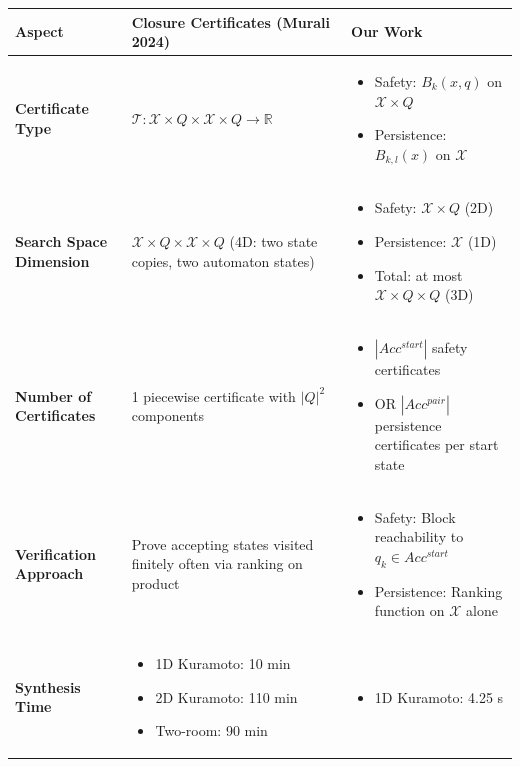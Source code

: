 \documentclass{article}
\begin{document}
\begin{center}
\begin{tabular}{|p{4cm}|p{5cm}|p{5cm}|}
\hline
\textbf{Aspect} & \textbf{Closure Certificates (Murali 2024)} & \textbf{Our Work} \\
\hline
\textbf{Certificate Type} & $\mathcal{T}: \mathcal{X} \times Q \times \mathcal{X} \times Q \rightarrow \mathbb{R}$ &
\begin{itemize}
\item Safety: $B_k(x,q)$ on $\mathcal{X} \times Q$
\item Persistence: $B_{k,l}(x)$ on $\mathcal{X}$
\end{itemize} \\
\hline
\textbf{Search Space Dimension} & $\mathcal{X} \times Q \times \mathcal{X} \times Q$ (4D: two state copies, two automaton states) &
\begin{itemize}
\item Safety: $\mathcal{X} \times Q$ (2D)
\item Persistence: $\mathcal{X}$ (1D)
\item Total: at most $\mathcal{X} \times Q \times Q$ (3D)
\end{itemize} \\
\hline
\textbf{Number of Certificates} & 1 piecewise certificate with $|Q|^2$ components &
\begin{itemize}
\item $|Acc^{start}|$ safety certificates
\item OR $|Acc^{pair}|$ persistence certificates per start state
\end{itemize} \\
\hline
\textbf{Verification Approach} & Prove accepting states visited finitely often via ranking on product &
\begin{itemize}
\item Safety: Block reachability to $q_k \in Acc^{start}$
\item Persistence: Ranking function on $\mathcal{X}$ alone
\end{itemize} \\
\hline
\textbf{Synthesis Time} &
\begin{itemize}
\item 1D Kuramoto: 10 min
\item 2D Kuramoto: 110 min
\item Two-room: 90 min
\end{itemize} &
\begin{itemize}
\item 1D Kuramoto: 4.25 s

\end{itemize}
\end{tabular}
\end{center}
\end{document}
